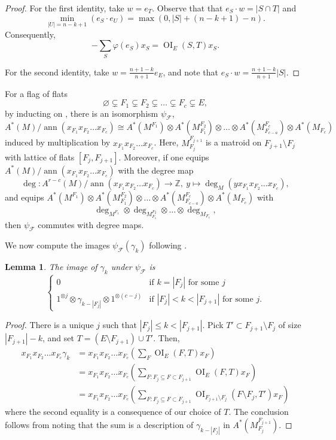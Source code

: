 \documentclass[10pt,a4paper]{amsart}
\numberwithin{equation}{section}
\numberwithin{figure}{section}
\newcommand{\Z}{\mathbb{Z}}
\newcommand{\cF}{\mathcal{F}}
\DeclareMathOperator{\OI}{OI}
\DeclareMathOperator{\ann}{ann}
\newtheorem{lemma}[theorem]{Lemma}
\theoremstyle{definition}
\theoremstyle{remark}
\begin{document}
\begin{proof}
For the first identity, take $w=e_T$. Observe that that $e_S\cdot w=|S\cap T|$ and 
\[\min_{|U|=n-k+1}(e_S\cdot e_U)=\max(0,|S|+(n-k+1)-n).\]
Consequently, 
\[-\sum_S \varphi(e_S)x_S=\OI_{E}(S,T)x_S.\]

For the second identity, take $w=\frac{n+1-k}{n+1}e_{E}$, and note that $e_S\cdot w=\frac{n+1-k}{n+1}|S|$. 
\end{proof}

For a flag of flats 
\[\varnothing\subsetneq F_1\subsetneq F_2\subsetneq\dots\subsetneq F_c\subsetneq E,\]
by inducting on \cite[Prop~2.25]{BHMPW:semismall}, there is an isomorphism $\psi_{\cF}$,
\[
A^*(M)/\ann(x_{F_1}x_{F_2}\dots x_{F_c})\cong
A^*(M^{F_1})\otimes A^*(M_{F_1}^{F_2})\otimes\dots \otimes A^*(M_{F_{c-a}}^{F_c})\otimes A^*(M_{F_c})
\]
induced by multiplication by $x_{F_1}x_{F_2}\dots x_{F_c}$.
Here, $M_{F_j}^{F_{j+1}}$ is a matroid on $F_{j+1}\setminus F_j$ with lattice of flats $[F_j,F_{j+1}]$.
Moreover, if one equips $A^*(M)/\ann(x_{F_1}x_{F_2}\dots x_{F_c})$ with the degree map
\[\deg\colon A^{r-c}(M)/\ann(x_{F_1}x_{F_2}\dots x_{F_c})\to\Z,\ y\mapsto \deg_M(yx_{F_1}x_{F_2}\dots x_{F_c}),\]
and equips $A^*(M^{F_1})\otimes A^*(M_{F_1}^{F_2})\otimes\dots \otimes A^*(M_{F_{c-a}}^{F_c})\otimes A^*(M_{F_c})$
with 
\[\deg_{M^{F_1}}\otimes\deg_{M_{F_1}^{F_2}}\otimes \dots \otimes \deg_{M_{F_c}},\]
then $\psi_{\cF}$ commutes with degree maps.

We now compute the images $\psi_{\cF}(\gamma_k)$ following \cite[Lemma 6.5]{BST}.

\setcounter{theorem}{5}
\begin{lemma} \label{l:productwithflag}
The image of $\gamma_k$ under $\psi_{\cF}$ is 
\[\begin{cases}
0 &\text{if $k=|F_j|$ for some $j$}\\
1^{\otimes j}\otimes \gamma_{k-|F_j|}\otimes 1^{\otimes(c-j)}&\text{if $|F_j|<k<|F_{j+1}|$ for some $j$}.
\end{cases}
\]
\end{lemma}

\begin{proof}
There is a unique $j$ such that $|F_j|\leq k<|F_{j+1}|$. Pick $T'\subset F_{j+1}\setminus F_j$ of size $|F_{j+1}|- k$, and set $T=(E\setminus F_{j+1})\cup T'$. Then,
  \begin{align*}
      x_{F_1}x_{F_2}\dots x_{F_c}\gamma_k
      &=  x_{F_1}x_{F_2}\dots x_{F_c}\left(\sum_F \OI_{E}(F,T)x_F\right)\\
      &=  x_{F_1}x_{F_2}\dots x_{F_c}\left(\sum_{F\colon F_j\subseteq F\subset F_{j+1}} \OI_{E}(F,T)x_F\right)\\
      &=  x_{F_1}x_{F_2}\dots x_{F_c}\left(\sum_{F\colon F_j\subseteq F\subset F_{j+1}} \OI_{F_{j+1}\setminus F_j}(F\setminus F_j,T')x_F\right)
  \end{align*}
  where the second equality is a consequence of our choice of $T$.
  The conclusion follows from noting that the sum is a description of $\gamma_{k-|F_j|}$ in $A^*(M_{F_j}^{F_{j+1}})$.
\end{proof}
\end{document}
